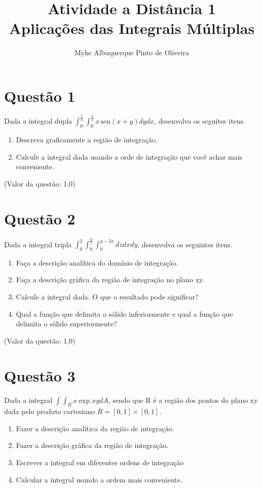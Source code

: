 \documentclass[10pt,a4paper]{article}
\author{Myke Albuquerque Pinto de Oliveira}
\title{\Huge Atividade a Distância 1 \\ 
	Aplicações das Integrais Múltiplas}
\newcommand{\sen}{\hspace{2pt}\textrm{sen}}
\begin{document}
	
	\maketitle
	\newpage
	
	\section*{Questão 1}
	
	Dada a integral dupla $ \int_{0}^{\frac{\pi}{6}} \int_{0}^{\frac{\pi}{3}} x \sen (x + y) dy dx $, desenvolva os seguites itens.
	
	\begin{enumerate}
		\item Descreva graficamente a região de integração.
		\item Calcule a integral dada usando a orde de integração que você achar mais conveniente.
	\end{enumerate}
	
	(Valor da questão: 1,0)
	
	\section*{Questão 2}
	
	Dada a integral tripla $ \int_{0}^{2} \int_{0}^{\frac{y}{2}} \int_{0}^{y-2x} dz dx dy $, desenvolva os seguintes itens.
	
	\begin{enumerate}
		\item Faça a descrição analítica do domínio de integração.
		\item Faça a descrição gráfica da região de integração no plano xy.
		\item Calcule a integral dada. O que o resultado pode significar?
		\item Qual a função que delimita o sólido inferiormente e qual a função que delimita o sólido superiormente?
	\end{enumerate}
	
	(Valor da questão: 1,0)
	
	\section*{Questão 3}
	
	Dada a integral $ \int \int_R x \exp{xy} dA $, sendo que R é a região dos pontos do plano xy dada pelo produto cartesiano $ R=[0, 1] \times [0, 1] $.
	
	\begin{enumerate}
		\item Fazer a descrição analítica da região de integração.
		\item Fazer a descrição gráfica da região de integração.
		\item Escrever a integral em diferentes ordens de integração
		\item Calcular a integral usando a ordem mais conveniente.
	\end{enumerate}
\end{document}
